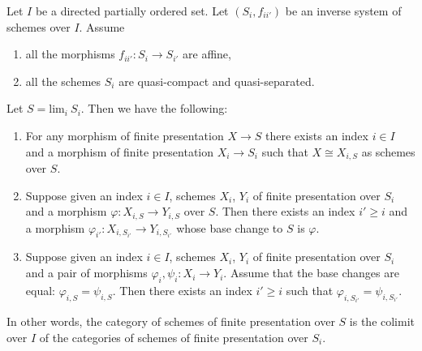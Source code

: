 \begin{lemma}
\label{lemma-descend-finite-presentation}
Let $I$ be a directed partially ordered set.
Let $(S_i, f_{ii'})$ be an inverse system of schemes over $I$.
Assume
\begin{enumerate}
\item all the morphisms $f_{ii'} : S_i \to S_{i'}$ are affine,
\item all the schemes $S_i$ are quasi-compact and quasi-separated.
\end{enumerate}
Let $S = \text{lim}_i\ S_i$. Then we have the following:
\begin{enumerate}
\item For any morphism of finite presentation $X \to S$
there exists an index $i \in I$ and a morphism of finite
presentation $X_i \to S_i$ such that $X \cong X_{i, S}$ as
schemes over $S$.
\item Suppose given an index $i \in I$, schemes
$X_i$, $Y_i$ of finite presentation over $S_i$ and a morphism
$\varphi : X_{i, S} \to Y_{i, S}$ over $S$. Then there exists an index
$i' \geq i$ and a morphism
$\varphi_{i'} : X_{i, S_{i'}} \to Y_{i, S_{i'}}$
whose base change to $S$ is $\varphi$.
\item Suppose given an index $i \in I$, schemes
$X_i$, $Y_i$ of finite presentation over $S_i$ and a pair of morphisms
$\varphi_i, \psi_i : X_i \to Y_i$.
Assume that the base changes are equal: $\varphi_{i, S} = \psi_{i, S}$.
Then there exists an index $i' \geq i$ such that
$\varphi_{i, S_{i'}} = \psi_{i, S_{i'}}$.
\end{enumerate}
In other words, the category of schemes of finite presentation over
$S$ is the colimit over $I$ of the categories of schemes of finite
presentation over $S_i$.
\end{lemma}

